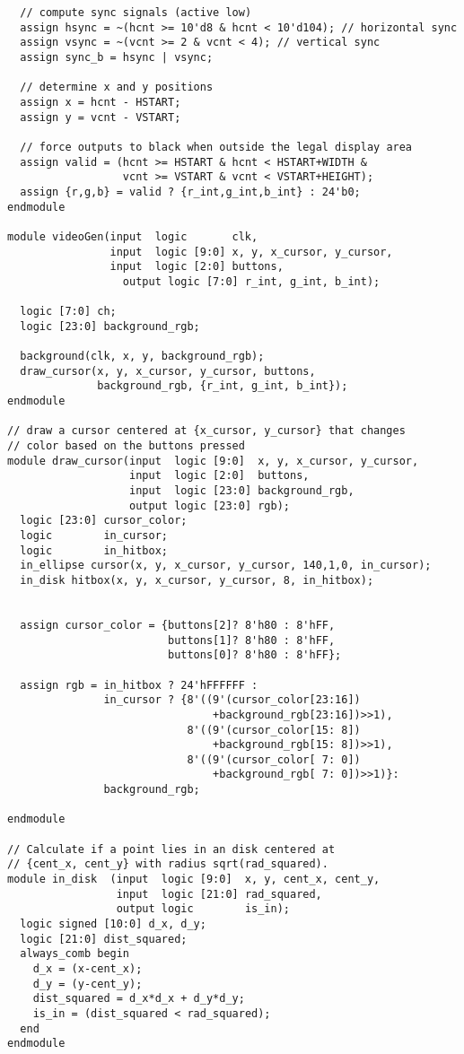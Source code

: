 \documentclass{article}
\begin{document}
\begin{verbatim}
  // compute sync signals (active low)
  assign hsync = ~(hcnt >= 10'd8 & hcnt < 10'd104); // horizontal sync
  assign vsync = ~(vcnt >= 2 & vcnt < 4); // vertical sync
  assign sync_b = hsync | vsync;

  // determine x and y positions
  assign x = hcnt - HSTART;
  assign y = vcnt - VSTART;
  
  // force outputs to black when outside the legal display area
  assign valid = (hcnt >= HSTART & hcnt < HSTART+WIDTH &
                  vcnt >= VSTART & vcnt < VSTART+HEIGHT);
  assign {r,g,b} = valid ? {r_int,g_int,b_int} : 24'b0;
endmodule

module videoGen(input  logic       clk,
                input  logic [9:0] x, y, x_cursor, y_cursor,
                input  logic [2:0] buttons,
           		  output logic [7:0] r_int, g_int, b_int);

  logic [7:0] ch;
  logic [23:0] background_rgb;
  
  background(clk, x, y, background_rgb);
  draw_cursor(x, y, x_cursor, y_cursor, buttons,
              background_rgb, {r_int, g_int, b_int});
endmodule

// draw a cursor centered at {x_cursor, y_cursor} that changes
// color based on the buttons pressed
module draw_cursor(input  logic [9:0]  x, y, x_cursor, y_cursor,
                   input  logic [2:0]  buttons,
                   input  logic [23:0] background_rgb,
                   output logic [23:0] rgb);
  logic [23:0] cursor_color;
  logic        in_cursor;
  logic        in_hitbox;
  in_ellipse cursor(x, y, x_cursor, y_cursor, 140,1,0, in_cursor);
  in_disk hitbox(x, y, x_cursor, y_cursor, 8, in_hitbox);
  
  
  assign cursor_color = {buttons[2]? 8'h80 : 8'hFF,
                         buttons[1]? 8'h80 : 8'hFF,
                         buttons[0]? 8'h80 : 8'hFF};
  
  assign rgb = in_hitbox ? 24'hFFFFFF : 
               in_cursor ? {8'((9'(cursor_color[23:16])
                                +background_rgb[23:16])>>1),
                            8'((9'(cursor_color[15: 8])
                                +background_rgb[15: 8])>>1),
                            8'((9'(cursor_color[ 7: 0])
                                +background_rgb[ 7: 0])>>1)}: 
               background_rgb;
                   
endmodule

// Calculate if a point lies in an disk centered at 
// {cent_x, cent_y} with radius sqrt(rad_squared).
module in_disk  (input  logic [9:0]  x, y, cent_x, cent_y,
                 input  logic [21:0] rad_squared,
                 output logic        is_in);
  logic signed [10:0] d_x, d_y;
  logic [21:0] dist_squared;
  always_comb begin
    d_x = (x-cent_x);
    d_y = (y-cent_y);
    dist_squared = d_x*d_x + d_y*d_y;
    is_in = (dist_squared < rad_squared);
  end
endmodule


\end{verbatim}
\end{document}

